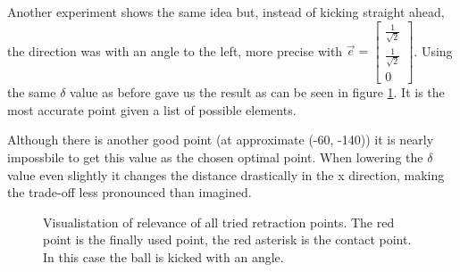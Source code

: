 \documentclass[a4paper]{article}
\begin{document}
Another experiment shows the same idea but, instead of kicking straight ahead,
the direction was with an angle to the left, more precise with  $\vec{e} =
\begin{bmatrix} \frac{1}{\sqrt{2}}\\
\frac{1}{\sqrt{2}} \\ 0 \end{bmatrix}$. Using the same $\delta$ value as before gave us
the result as can be seen in figure \ref{fig:retraction_plot2}. It is the most
accurate point given a list of possible elements. 

Although there is another good point (at approximate (-60, -140)) it is nearly
impossbile to get this value as the chosen optimal point. When lowering the
$\delta$ value even slightly it changes the distance drastically in the x
direction, making the trade-off less pronounced than imagined.

\begin{figure}[htbp]
  \centering
  \caption{Visualistation of relevance of all tried retraction points. The red
      point is the finally used point, the red asterisk is the contact point. 
      In this case the ball is kicked with an angle.
         }
  \label{fig:retraction_plot2}
\end{figure}
\end{document}
